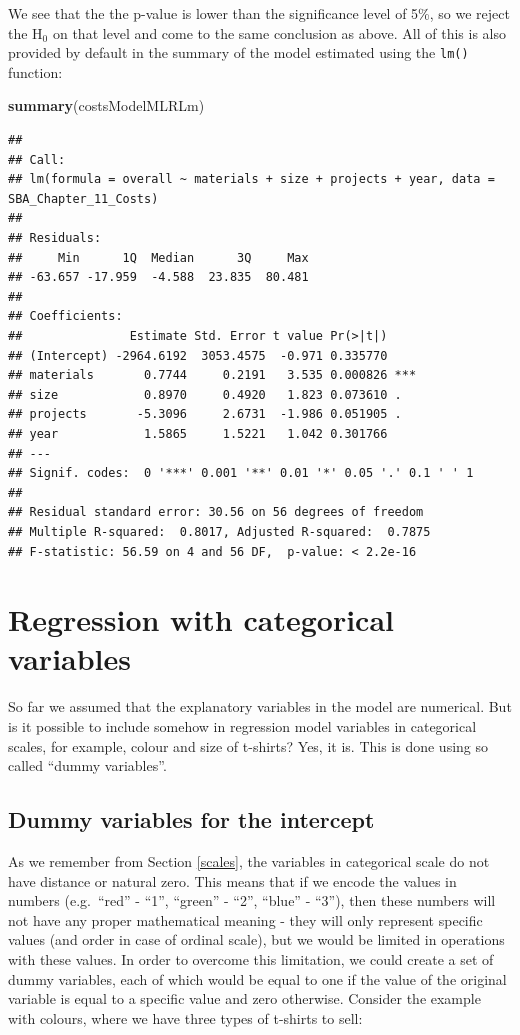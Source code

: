 \documentclass[
]{book}
\newenvironment{Shaded}{\begin{snugshade}}{\end{snugshade}}
\newcommand{\FunctionTok}[1]{\textcolor[rgb]{0.13,0.29,0.53}{\textbf{#1}}}
\newcommand{\NormalTok}[1]{#1}
\theoremstyle{definition}
\theoremstyle{definition}
\theoremstyle{definition}
\theoremstyle{definition}
\theoremstyle{remark}
\begin{document}
We see that the the p-value is lower than the significance level of 5\%, so we reject the H\(_0\) on that level and come to the same conclusion as above. All of this is also provided by default in the summary of the model estimated using the \texttt{lm()} function:

\begin{Shaded}
\begin{Highlighting}[]
\FunctionTok{summary}\NormalTok{(costsModelMLRLm)}
\end{Highlighting}
\end{Shaded}

\begin{verbatim}
## 
## Call:
## lm(formula = overall ~ materials + size + projects + year, data = SBA_Chapter_11_Costs)
## 
## Residuals:
##     Min      1Q  Median      3Q     Max 
## -63.657 -17.959  -4.588  23.835  80.481 
## 
## Coefficients:
##               Estimate Std. Error t value Pr(>|t|)    
## (Intercept) -2964.6192  3053.4575  -0.971 0.335770    
## materials       0.7744     0.2191   3.535 0.000826 ***
## size            0.8970     0.4920   1.823 0.073610 .  
## projects       -5.3096     2.6731  -1.986 0.051905 .  
## year            1.5865     1.5221   1.042 0.301766    
## ---
## Signif. codes:  0 '***' 0.001 '**' 0.01 '*' 0.05 '.' 0.1 ' ' 1
## 
## Residual standard error: 30.56 on 56 degrees of freedom
## Multiple R-squared:  0.8017, Adjusted R-squared:  0.7875 
## F-statistic: 56.59 on 4 and 56 DF,  p-value: < 2.2e-16
\end{verbatim}

\chapter{Regression with categorical variables}\label{dummyVariables}

So far we assumed that the explanatory variables in the model are numerical. But is it possible to include somehow in regression model variables in categorical scales, for example, colour and size of t-shirts? Yes, it is. This is done using so called ``dummy variables''.

\section{Dummy variables for the intercept}\label{dummy-variables-for-the-intercept}

As we remember from Section \ref{scales}, the variables in categorical scale do not have distance or natural zero. This means that if we encode the values in numbers (e.g.~``red'' - ``1'', ``green'' - ``2'', ``blue'' - ``3''), then these numbers will not have any proper mathematical meaning - they will only represent specific values (and order in case of ordinal scale), but we would be limited in operations with these values. In order to overcome this limitation, we could create a set of dummy variables, each of which would be equal to one if the value of the original variable is equal to a specific value and zero otherwise. Consider the example with colours, where we have three types of t-shirts to sell:
\end{document}
